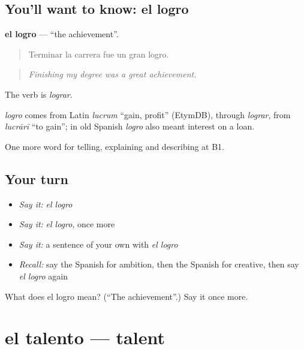 \subsection*{You'll want to know: el logro}
\textbf{el logro} — \textquotedblleft{}the achievement\textquotedblright{}.

\begin{quote}
Terminar la carrera fue un gran logro.
\end{quote}

\begin{quote}
\emph{Finishing my degree was a great achievement.}
\end{quote}

The verb is \emph{lograr}.

\begin{cousinweb}
\emph{logro} comes from Latin \emph{lucrum} \textquotedblleft{}gain, profit\textquotedblright{} (EtymDB), through \emph{lograr}, from \emph{lucrārī} \textquotedblleft{}to gain\textquotedblright{}; in old Spanish \emph{logro} also meant interest on a loan.
\end{cousinweb}

\begin{grammarlens}[title={What you've built}]
One more word for telling, explaining and describing at B1.
\end{grammarlens}

\subsection*{Your turn}
\begin{itemize}
\raggedright
  \item \emph{Say it:} \emph{el logro}
  \item \emph{Say it:} \emph{el logro}, once more
  \item \emph{Say it:} a sentence of your own with \emph{el logro}
  \item \emph{Recall:} say the Spanish for ambition, then the Spanish for creative, then say \emph{el logro} again
\end{itemize}

\begin{tcolorbox}[breakable,colback=teal!4,colframe=teal!35!black,title={Before you move on}]
What does el logro mean? (\textquotedblleft{}The achievement\textquotedblright{}.) Say it once more.
\end{tcolorbox}
\section[el talento]{el talento — talent}

